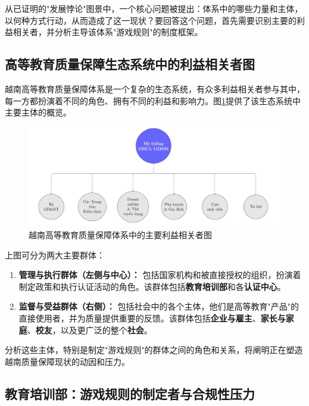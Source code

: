 从已证明的"发展悖论"图景中，一个核心问题被提出：体系中的哪些力量和主体，以何种方式行动，从而造成了这一现状？要回答这个问题，首先需要识别主要的利益相关者，并分析主导该体系"游戏规则"的制度框架。

\subsection{高等教育质量保障生态系统中的利益相关者图}

越南高等教育质量保障体系是一个复杂的生态系统，有众多利益相关者参与其中，每一方都扮演着不同的角色、拥有不同的利益和影响力。图\ref{fig:so_do_he_thong_dbcl}提供了该生态系统中主要主体的概览。

\begin{figure}[h!]
    \centering
    \includegraphics[width=\textwidth]{image/he_thong_dbcl_gddh.jpg}
    \caption{越南高等教育质量保障体系中的主要利益相关者图}
    \label{fig:so_do_he_thong_dbcl}
\end{figure}

上图可分为两大主要群体：
\begin{enumerate}
    \item \textbf{管理与执行群体（左侧与中心）：} 包括国家机构和被直接授权的组织，扮演着制定政策和执行认证活动的角色。该群体包括\textbf{教育培训部}和各\textbf{认证中心}。
    \item \textbf{监督与受益群体（右侧）：} 包括社会中的各个主体，他们是高等教育"产品"的直接使用者，并为质量提供重要的反馈。该群体包括\textbf{企业与雇主}、\textbf{家长与家庭}、\textbf{校友}，以及更广泛的整个\textbf{社会}。
\end{enumerate}
分析这些主体，特别是制定"游戏规则"的群体之间的角色和关系，将阐明正在塑造越南质量保障现状的动因和压力。

\subsection{教育培训部：游戏规则的制定者与合规性压力}
\label{subsec:vai_tro_moet}

